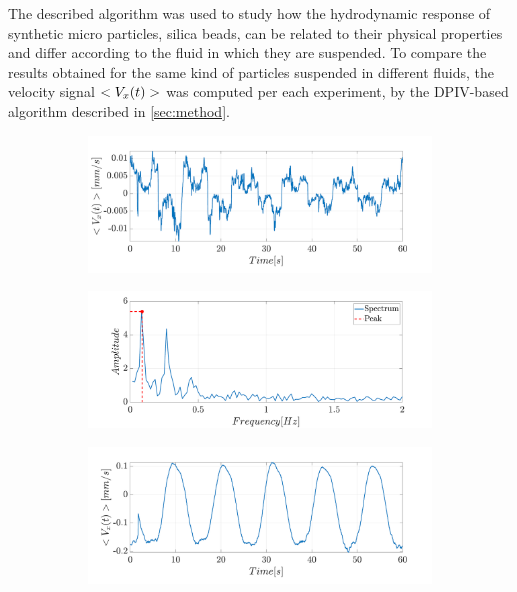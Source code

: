 \documentclass[journal]{IEEEtran}
\theoremstyle{definition}
\theoremstyle{remark}
\begin{document}
The described algorithm was used to study how the hydrodynamic response of synthetic micro particles, silica beads, can be related to their physical properties and differ according to the fluid in which they are suspended. To compare the results obtained for the same kind of particles suspended in different fluids, the velocity signal $<V_{x}(t)>$ was computed per each experiment, by the DPIV-based algorithm described in \sect\ref{sec:method}.

\begin{figure}[t]
\centering
    \begin{subfigure}[b]{\columnwidth}
    \centering
	\includegraphics[width=1\columnwidth]{images/BeadsA}
	\caption{}
	\label{A}
    \end{subfigure}
    \begin{subfigure}[b]{\columnwidth}
	\centering
	\includegraphics[width=1\columnwidth]{images/BeadsB}
	\caption{}
	\label{B}
    \end{subfigure}
    \begin{subfigure}[b]{\columnwidth}
	\centering
	\includegraphics[width=1\columnwidth]{images/BeadsC}

\end{subfigure}
\end{figure}
\end{document}
